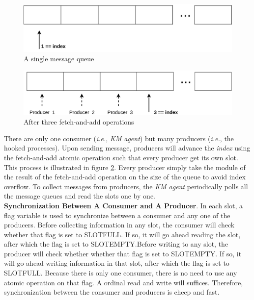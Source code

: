 \documentclass[letterpaper,twocolumn,10pt]{article}
\begin{document}
\begin{subfigures}
    \begin{figure}[H]
    \centering
    \includegraphics[scale=0.04]{messagequeue}
    \caption{\label{fig:singlemq}A single message queue}
\end{figure}
    \begin{figure}[H]
    \centering
    \includegraphics[scale=0.04]{afterfetchandadd}
    \caption{\label{fig:afterfa}After three fetch-and-add operations}
\end{figure}
\end{subfigures}

\noindent
There are only one consumer (\textit{i.e.}, \textit{KM agent}) but many
producers (\textit{i.e.}, the hooked processes). Upon sending message,
producers will advance the \textit{index} using the fetch-and-add atomic
operation such that every producer get its own slot. This process is
illustrated in figure \ref{fig:afterfa}. Every producer simply take the
module of the result of the fetch-and-add operation on the size of the queue
to avoid index overflow. To collect messages from producers, the \textit{KM
agent} periodically polls all the message queues and read the slots one by
one.\\ 

\noindent
\textbf{Synchronization Between A Consumer and A Producer}. In each slot, a
flag variable is used to synchronize between a consumer and any one of the
producers. Before collecting information in any slot, the consumer will check
whether that flag is set to SLOTFULL. If so, it will go ahead reading the
slot, after which the flag is set to SLOTEMPTY.Before writing to any slot,
the producer will check whether whether that flag is set to SLOTEMPTY. If so,
it will go ahead writing information in that slot, after which the flag is
set to SLOTFULL. Because there is only one consumer, there is no need to use
any atomic operation on that flag. A ordinal read and write will suffices.
Therefore, synchronization between the consumer and producers is cheep and
fast.\\
\end{document}
